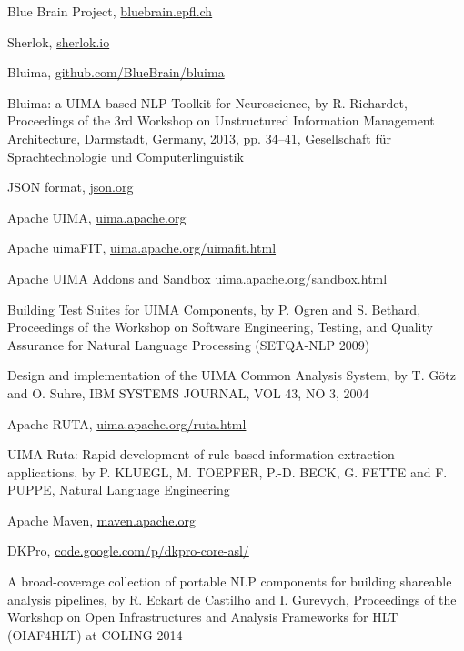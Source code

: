 \documentclass{article}
\begin{document}
\begin{thebibliography}{99}

    Blue Brain Project,
    \href{http://bluebrain.epfl.ch/}{bluebrain.epfl.ch}

    Sherlok,
    \href{http://sherlok.io}{sherlok.io}

    Bluima,
    \href{https://github.com/BlueBrain/bluima}{github.com/BlueBrain/bluima}

    Bluima: a UIMA-based NLP Toolkit for Neuroscience,
    by R. Richardet,
    Proceedings of the 3rd Workshop on Unstructured Information Management Architecture, Darmstadt,
    Germany, 2013, pp. 34–41, Gesellschaft für Sprachtechnologie und Computerlinguistik

    JSON format,
    \href{http://json.org/}{json.org}

    Apache UIMA,
    \href{https://uima.apache.org/}{uima.apache.org}

    Apache uimaFIT,
    \href{https://uima.apache.org/uimafit.html}{uima.apache.org/uimafit.html}

    Apache UIMA Addons and Sandbox
    \href{https://uima.apache.org/sandbox.html}{uima.apache.org/sandbox.html}

    Building Test Suites for UIMA Components,
    by P. Ogren and S. Bethard,
    Proceedings of the Workshop on Software Engineering, Testing, and Quality Assurance for Natural
    Language Processing (SETQA-NLP 2009)

    Design and implementation of the UIMA Common Analysis System,
    by T. Götz and O. Suhre,
    IBM SYSTEMS JOURNAL, VOL 43, NO 3, 2004

    Apache RUTA,
    \href{https://uima.apache.org/ruta.html}{uima.apache.org/ruta.html}

    UIMA Ruta: Rapid development of rule-based information extraction applications,
    by P. KLUEGL, M. TOEPFER, P.-D. BECK, G. FETTE and F. PUPPE,
    Natural Language Engineering

    Apache Maven,
    \href{https://maven.apache.org/}{maven.apache.org}

    DKPro,
    \href{https://code.google.com/p/dkpro-core-asl/}{code.google.com/p/dkpro-core-asl/}

    A broad-coverage collection of portable NLP components for building shareable analysis
    pipelines,
    by R. Eckart de Castilho and I. Gurevych,
    Proceedings of the Workshop on Open Infrastructures and Analysis Frameworks for HLT (OIAF4HLT)
    at COLING 2014


\end{thebibliography}
\end{document}
